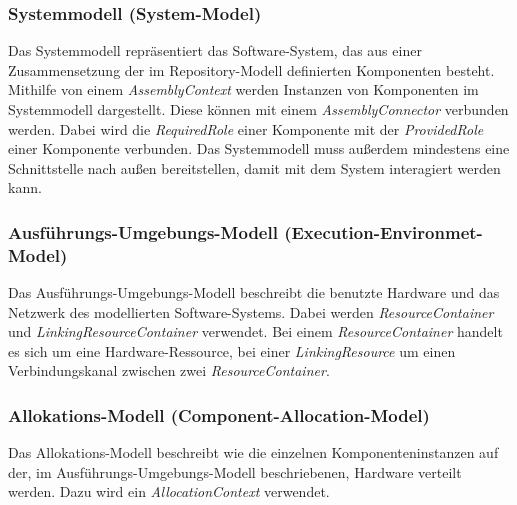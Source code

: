 \subsubsection*{Systemmodell (System-Model)}
Das Systemmodell repräsentiert das Software-System, das aus einer Zusammensetzung der im Repository-Modell definierten Komponenten besteht. Mithilfe von einem \emph{AssemblyContext} werden Instanzen von Komponenten im Systemmodell dargestellt. Diese können mit einem \emph{AssemblyConnector} verbunden werden. Dabei wird die \emph{RequiredRole} einer Komponente mit der \emph{ProvidedRole} einer Komponente verbunden. Das Systemmodell muss außerdem mindestens eine Schnittstelle nach außen bereitstellen, damit mit dem System interagiert werden kann. 
\subsubsection*{Ausführungs-Umgebungs-Modell (Execution-Environmet-Model)}
Das Ausführungs-Umgebungs-Modell beschreibt die benutzte Hardware und das Netzwerk des modellierten Software-Systems. Dabei werden \emph{ResourceContainer} und \emph{LinkingResourceContainer} verwendet. Bei einem \emph{ResourceContainer} handelt es sich um eine Hardware-Ressource, bei einer \emph{LinkingResource} um einen Verbindungskanal zwischen zwei \emph{ResourceContainer}. 
\subsubsection*{Allokations-Modell (Component-Allocation-Model)}
Das Allokations-Modell beschreibt wie die einzelnen Komponenteninstanzen auf der, im Ausführungs-Umgebungs-Modell beschriebenen, Hardware verteilt werden. Dazu wird ein \emph{AllocationContext} verwendet. 
